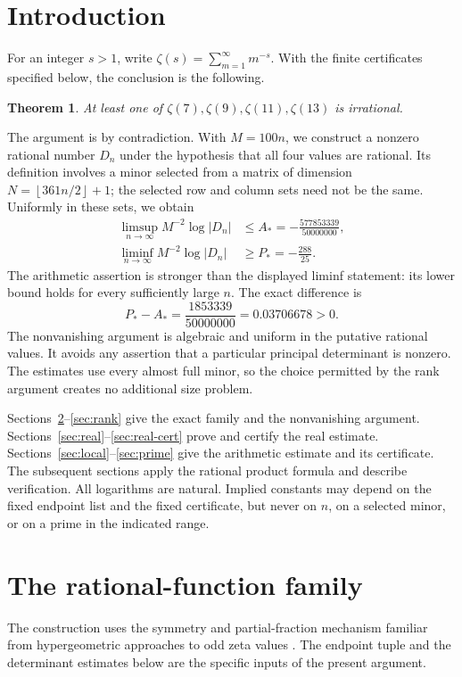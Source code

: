 \documentclass[11pt]{article}
\newtheorem{theorem}{Theorem}[section]
\theoremstyle{definition}\newtheorem{definition}[theorem]{Definition}
\theoremstyle{remark}\newtheorem{remark}[theorem]{Remark}
\newcommand{\floor}[1]{\left\lfloor#1\right\rfloor}
\newcommand{\abs}[1]{\left|#1\right|}
\begin{document}
\section{Introduction}
For an integer $s>1$, write $\zeta(s)=\sum_{m=1}^\infty m^{-s}$.
With the finite certificates specified below, the conclusion is the following.
\begin{theorem}\label{thm:main}
At least one of $\zeta(7),\zeta(9),\zeta(11),\zeta(13)$ is irrational.
\end{theorem}
The argument is by contradiction.  With $M=100n$, we construct a nonzero
rational number $D_n$ under the hypothesis that all four values are rational.
Its definition involves a minor selected from a matrix of dimension
$N=\floor{361n/2}+1$; the selected row and column sets need not be the same.
Uniformly in these sets, we obtain
\begin{align}
\limsup_{n\to\infty}M^{-2}\log\abs{D_n}
 &\le A_*=-\frac{577853339}{50000000},\label{eq:main-upper}\\
\liminf_{n\to\infty}M^{-2}\log\abs{D_n}
 &\ge P_*=-\frac{288}{25}.\label{eq:main-lower}
\end{align}
The arithmetic assertion is stronger than the displayed liminf statement:
its lower bound holds for every sufficiently large $n$. The exact difference is
\begin{equation}\label{eq:gap}
 P_*-A_* = \frac{1853339}{50000000}
 =0.03706678>0.
\end{equation}
The nonvanishing argument is algebraic and uniform in the putative rational
values.  It avoids any assertion that a particular principal determinant is
nonzero.  The estimates use every almost full minor, so the choice permitted
by the rank argument creates no additional size problem.

Sections~\ref{sec:family}--\ref{sec:rank} give the exact family and the
nonvanishing argument.  Sections~\ref{sec:real}--\ref{sec:real-cert} prove
and certify the real estimate.  Sections~\ref{sec:local}--\ref{sec:prime}
give the arithmetic estimate and its certificate. The subsequent sections apply
the rational product formula and describe verification. All logarithms are natural.  Implied constants
may depend on the fixed endpoint list and the fixed certificate, but never
on $n$, on a selected minor, or on a prime in the indicated range.

\section{The rational-function family}\label{sec:family}
The construction uses the symmetry and partial-fraction mechanism familiar
from hypergeometric approaches to odd zeta values \cite{Zudilin04}.
The endpoint tuple and the determinant estimates below are the specific
inputs of the present argument.
\end{document}
